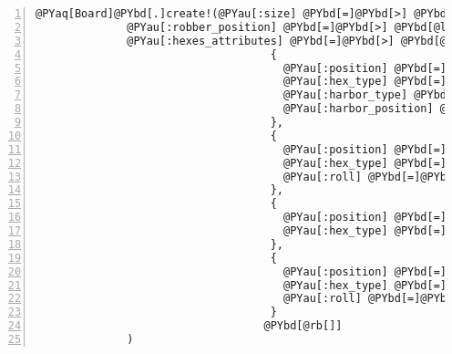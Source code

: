 \begin{Verbatim}[commandchars=@\[\],numbers=left,firstnumber=1,stepnumber=1]
@PYaq[Board]@PYbd[.]create!(@PYau[:size] @PYbd[=]@PYbd[>] @PYbd[@lb[]]@PYag[2], @PYag[2]@PYbd[@rb[]],
              @PYau[:robber_position] @PYbd[=]@PYbd[>] @PYbd[@lb[]]@PYag[1], @PYag[0]@PYbd[@rb[]],
              @PYau[:hexes_attributes] @PYbd[=]@PYbd[>] @PYbd[@lb[]]
                                    {
                                      @PYau[:position] @PYbd[=]@PYbd[>] @PYbd[@lb[]]@PYag[0], @PYag[0]@PYbd[@rb[]],
                                      @PYau[:hex_type] @PYbd[=]@PYbd[>] @PYaW["]@PYaW[sea]@PYaW["],
                                      @PYau[:harbor_type] @PYbd[=]@PYbd[>] @PYaW["]@PYaW[generic]@PYaW["],
                                      @PYau[:harbor_position] @PYbd[=]@PYbd[>] @PYag[5]
                                    },
                                    {
                                      @PYau[:position] @PYbd[=]@PYbd[>] @PYbd[@lb[]]@PYag[0], @PYag[1]@PYbd[@rb[]],
                                      @PYau[:hex_type] @PYbd[=]@PYbd[>] @PYaW["]@PYaW[forest]@PYaW["],
                                      @PYau[:roll] @PYbd[=]@PYbd[>] @PYag[6]
                                    },
                                    {
                                      @PYau[:position] @PYbd[=]@PYbd[>] @PYbd[@lb[]]@PYag[1], @PYag[0]@PYbd[@rb[]],
                                      @PYau[:hex_type] @PYbd[=]@PYbd[>] @PYaW["]@PYaW[desert]@PYaW["]
                                    },
                                    {
                                      @PYau[:position] @PYbd[=]@PYbd[>] @PYbd[@lb[]]@PYag[1], @PYag[1]@PYbd[@rb[]],
                                      @PYau[:hex_type] @PYbd[=]@PYbd[>] @PYaW["]@PYaW[hill]@PYaW["],
                                      @PYau[:roll] @PYbd[=]@PYbd[>] @PYag[8]
                                    }
                                   @PYbd[@rb[]]
              )
\end{Verbatim}
